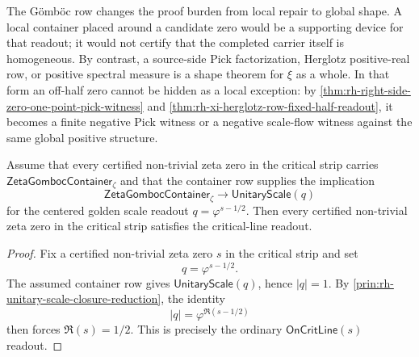 \begin{principle}
\label{prin:rh-gomboc-source-shape-proof-form}
The G\"omb\"oc row changes the proof burden from local repair to global
shape.  A local container placed around a candidate zero would be a
supporting device for that readout; it would not certify that the
completed carrier itself is homogeneous.  By contrast, a source-side Pick
factorization, Herglotz positive-real row, or positive spectral measure
is a shape theorem for $\xi$ as a whole.  In that form an off-half zero
cannot be hidden as a local exception: by
\autoref{thm:rh-right-side-zero-one-point-pick-witness} and
\autoref{thm:rh-xi-herglotz-row-fixed-half-readout}, it becomes a finite
negative Pick witness or a negative scale-flow witness against the same
global positive structure.
\end{principle}

\begin{theorem}
\label{thm:rh-gomboc-container-unitary-scale-reduction}
Assume that every certified non-trivial zeta zero in the critical strip
carries $\mathsf{ZetaGombocContainer}_{\zeta}$ and that the container row
supplies the implication
$$
\mathsf{ZetaGombocContainer}_{\zeta}
\to
\mathsf{UnitaryScale}(q)
$$
for the centered golden scale readout $q=\varphi^{s-1/2}$.  Then every
certified non-trivial zeta zero in the critical strip satisfies the
critical-line readout.
\end{theorem}

\begin{proof}
Fix a certified non-trivial zeta zero $s$ in the critical strip and set
$$
q=\varphi^{s-1/2}.
$$
The assumed container row gives $\mathsf{UnitaryScale}(q)$, hence
$|q|=1$.  By
\autoref{prin:rh-unitary-scale-closure-reduction}, the identity
$$
|q|=\varphi^{\Re(s-1/2)}
$$
then forces $\Re(s)=1/2$.  This is precisely the ordinary
$\mathsf{OnCritLine}(s)$ readout.
\end{proof}


